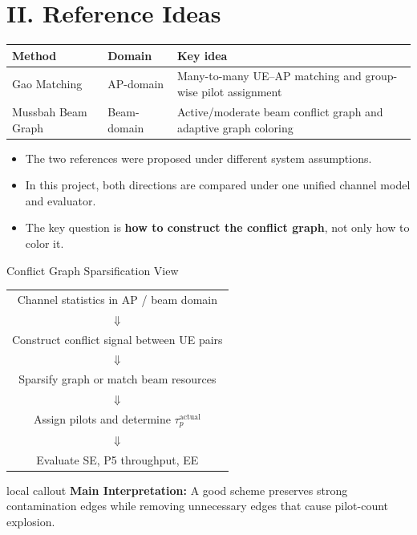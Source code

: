 \documentclass[aspectratio=169, 10pt]{beamer}
\newcommand{\tauactual}{\tau_p^{\mathrm{actual}}}
\newcommand{\slidecallout}[2]{%
    \vspace{0.08cm}%
    \begin{beamercolorbox}[wd=\linewidth,sep=0.55ex,leftskip=0.8ex,rightskip=0.8ex,rounded=true]{local callout}
        \small{\color{ku_crimson}\bfseries #1:} #2
    \end{beamercolorbox}%
}
\begin{document}
\section{II. Reference Ideas}
\OnlyTitle
\begin{frame}{\insertsectionhead}
    \begin{table}
        \centering
        \small
        \begin{tabular}{p{}p{}p{}}
            \toprule
            Method             & Domain      & Key idea                                                        \\
            \midrule
            Gao Matching       & AP-domain   & Many-to-many UE--AP matching and group-wise pilot assignment    \\
            Mussbah Beam Graph & Beam-domain & Active/moderate beam conflict graph and adaptive graph coloring \\
            \bottomrule
        \end{tabular}
    \end{table}

    \vspace{0.3cm}
    \begin{itemize}
        \setlength{\itemsep}{0.8em}
        \item The two references were proposed under different system assumptions.
        \item In this project, both directions are compared under one unified channel model and evaluator.
        \item The key question is \textbf{how to construct the conflict graph}, not only how to color it.
    \end{itemize}
\end{frame}

\begin{frame}{Conflict Graph Sparsification View}
    \centering
    \begin{tabular}{c}
        Channel statistics in AP / beam domain     \\
        \(\Downarrow\)                             \\
        Construct conflict signal between UE pairs \\
        \(\Downarrow\)                             \\
        Sparsify graph or match beam resources     \\
        \(\Downarrow\)                             \\
        Assign pilots and determine \(\tauactual\) \\
        \(\Downarrow\)                             \\
        Evaluate SE, P5 throughput, EE
    \end{tabular}

    \vspace{0.4cm}
    \slidecallout{Main Interpretation}{A good scheme preserves strong contamination edges while removing unnecessary edges that cause pilot-count explosion.}
\end{frame}
\end{document}
